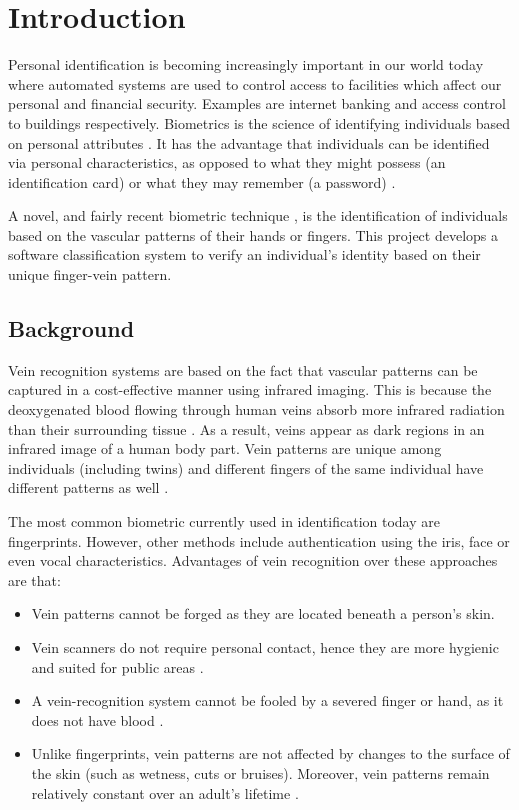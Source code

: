 \chapter{Introduction}
Personal identification is becoming increasingly important in our world today where automated systems are used to control access to facilities which affect our personal and financial security. Examples are internet banking and access control to buildings respectively. Biometrics is the science of identifying individuals based on personal attributes \cite{jain2007handbook}. It has the advantage that individuals can be identified via personal characteristics, as opposed to what they might possess (an identification card) or what they may remember (a password) \cite{Banescu2010}.
\par
A novel, and fairly recent biometric technique \cite{Wang2011}, is the identification of individuals based on the vascular patterns of their hands or fingers. This project develops a software classification system to verify an individual's identity based on their unique finger-vein pattern. 

\section{Background}
Vein recognition systems are based on the fact that vascular patterns can be captured in a cost-effective manner using infrared imaging. This is because the deoxygenated blood flowing through human veins absorb more infrared radiation than their surrounding tissue \cite{Pflug2012}. As a result, veins appear as dark regions in an infrared image of a human body part. Vein patterns are unique among individuals (including twins) \cite{Yanagawa2007} and different fingers of the same individual have different patterns as well \cite{Lu2013}. 
\par
The most common biometric currently used in identification today are fingerprints. However, other methods include authentication using the iris, face or even vocal characteristics. Advantages of vein recognition over these approaches are that:
\begin{itemize}
	\item Vein patterns cannot be forged as they are located beneath a person's skin. 
	\item Vein scanners do not require personal contact, hence they are more hygienic and suited for public areas \cite{Pflug2012}. 
	\item A vein-recognition system cannot be fooled by a severed finger or hand, as it does not have blood \cite{wilson2011vein}. 
	\item Unlike fingerprints, vein patterns are not affected by changes to the surface of the skin (such as wetness, cuts or bruises). Moreover, vein patterns remain relatively constant over an adult's lifetime \cite{Djerouni2014}. 
\end{itemize}

